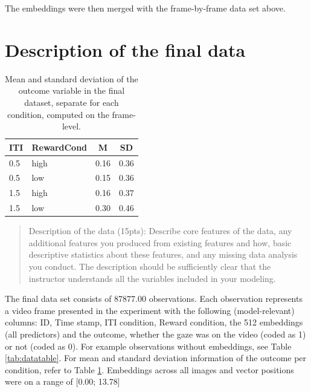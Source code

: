 \documentclass[
  man]{apa6}
\begin{document}
The embeddings were then merged with the frame-by-frame data set above.

\hypertarget{description-of-the-final-data}{%
\section{Description of the final data}\label{description-of-the-final-data}}

\begin{table}[tbp]

\begin{center}
\begin{threeparttable}

\caption{\label{tab:descriptives}Mean and standard deviation of the outcome variable in the final dataset, separate for each condition, computed on the frame-level.}

\begin{tabular}{llll}
\toprule
ITI & \multicolumn{1}{c}{RewardCond} & \multicolumn{1}{c}{M} & \multicolumn{1}{c}{SD}\\
\midrule
0.5 & high & 0.16 & 0.36\\
0.5 & low & 0.15 & 0.36\\
1.5 & high & 0.16 & 0.37\\
1.5 & low & 0.30 & 0.46\\
\bottomrule
\end{tabular}

\end{threeparttable}
\end{center}

\end{table}

\begin{quote}
Description of the data (15pts): Describe core features of the data, any additional features you produced from existing features and how, basic descriptive statistics about these features, and any missing data analysis you conduct. The description should be sufficiently clear that the instructor understands all the variables included in your modeling.
\end{quote}

The final data set consists of 87877.00 observations. Each observation represents a video frame presented in the experiment with the following (model-relevant) columns: ID, Time stamp, ITI condition, Reward condition, the 512 embeddings (all predictors) and the outcome, whether the gaze was on the video (coded as 1) or not (coded as 0). For example observations without embeddings, see Table \ref{tab:datatable}. For mean and standard deviation information of the outcome per condition, refer to Table \ref{tab:descriptives}. Embeddings across all images and vector positions were on a range of {[}0.00; 13.78{]}
\end{document}

